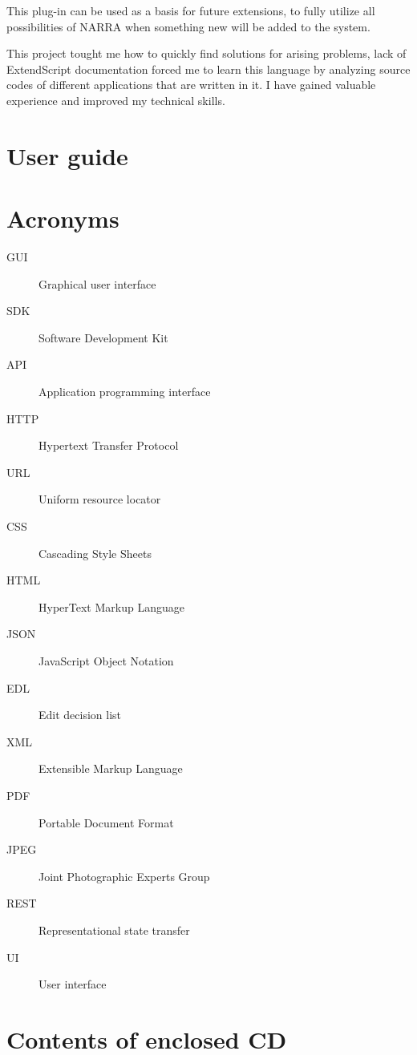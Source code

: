 \documentclass[thesis=B,english]{FITthesis}[2012/10/20]
\begin{document}
This plug-in can be used as a basis for future extensions, to fully utilize all possibilities of NARRA when something new will be added to the system. 

This project tought me how to quickly find solutions for arising problems, lack of ExtendScript documentation forced me to learn this language by analyzing source codes of different applications that are written in it. I have gained valuable experience and improved my technical skills.




\appendix

\chapter{User guide}


\chapter{Acronyms}
\begin{description}
	\item[GUI] Graphical user interface
	\item[SDK] Software Development Kit
	\item[API] Application programming interface
	\item[HTTP] Hypertext Transfer Protocol
	\item[URL] Uniform resource locator
	\item[CSS] Cascading Style Sheets
	\item[HTML] HyperText Markup Language
	\item[JSON] JavaScript Object Notation
	\item[EDL] Edit decision list
	\item[XML] Extensible Markup Language
	\item[PDF] Portable Document Format
	\item[JPEG] Joint Photographic Experts Group
	\item[REST] Representational state transfer
	\item[UI] User interface
\end{description}


\chapter{Contents of enclosed CD}


\begin{figure}
\end{figure}
\end{document}

